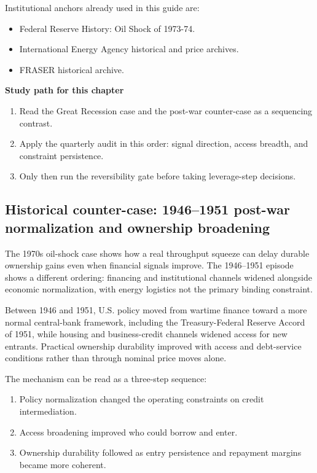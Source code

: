 \documentclass[11pt,openany]{book}
\begin{document}
Institutional anchors already used in this guide are:
\begin{itemize}
  \item Federal Reserve History: Oil Shock of 1973-74.
  \item International Energy Agency historical and price archives.
  \item FRASER historical archive.
\end{itemize}

\begin{notebox}
\textbf{Study path for this chapter}
\begin{enumerate}
  \item Read the Great Recession case and the post-war counter-case as a sequencing contrast.
  \item Apply the quarterly audit in this order: signal direction, access breadth, and constraint persistence.
  \item Only then run the reversibility gate before taking leverage-step decisions.
\end{enumerate}
\end{notebox}

\subsection{Historical counter-case: 1946--1951 post-war normalization and ownership broadening}
\label{subsec:postwar-normalization-countercase}

The 1970s oil-shock case shows how a real throughput squeeze can delay durable ownership gains even when financial signals improve.
The 1946--1951 episode shows a different ordering: financing and institutional channels widened alongside economic normalization, with energy logistics not the primary binding constraint.

Between 1946 and 1951, U.S. policy moved from wartime finance toward a more normal central-bank framework, including the Treasury-Federal Reserve Accord of 1951, while housing and business-credit channels widened access for new entrants.
Practical ownership durability improved with access and debt-service conditions rather than through nominal price moves alone.

The mechanism can be read as a three-step sequence:
\begin{enumerate}
  \item Policy normalization changed the operating constraints on credit intermediation.
  \item Access broadening improved who could borrow and enter.
  \item Ownership durability followed as entry persistence and repayment margins became more coherent.
\end{enumerate}
\end{document}
